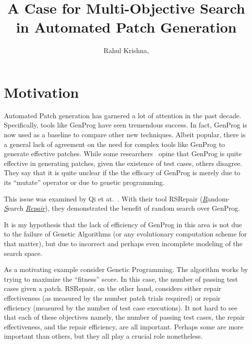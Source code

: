 \documentclass[9pt, compsoc, journal]{IEEEtran}
\begin{document}
  
  \title{A Case for Multi-Objective Search in Automated Patch Generation}
  \author{Rahul Krishna, 
  }

\maketitle
\section{Motivation}

Automated Patch generation has garnered a lot of attention in the past decade. Specifically, tools like GenProg have seen tremendous success. In fact, GenProg is now used as a baseline to compare other new techniques. Albeit popular, there is a general lack of agreement on the need for complex tools like GenProg to generate effective patches. While some researchers~\cite{leGoues12} opine that GenProg is quite effective in generating patches, given the existence of test cases, others \cite{qi2014, kim2013, arcuri2011} disagree. They say that it is quite unclear if the the efficacy of GenProg is merely due to its ``mutate'' operator or due to genetic programming.

This issue was examined by Qi et at.~\cite{qi2014}. With their tool RSRepair (\underline{\textit{R}}andom-\underline{\textit{S}}earch \underline{\textit{Repair}}), they demonstrated the benefit of random search over GenProg. 

It is my hypothesis that the lack of efficiency of GenProg in this area is not due to the failure of Genetic Algorithms (or any evolutionary computation scheme for that matter), but due to incorrect and perhaps even incomplete modeling of the search space.

As a motivating example consider Genetic Programming. The algorithm works by trying to maximize the ``fitness'' score. In this case, the number of passing test cases given a patch. RSRepair, on the other hand, considers either repair effectiveness (as measured by the number patch trials required) or repair efficiency (measured by the number of test case executions). It not hard to see that each of these objectives namely, the number of passing test cases, the repair effectiveness, and the repair efficiency, are all important. Perhaps some are more important than others, but they all play a crucial role nonetheless.
\end{document}
